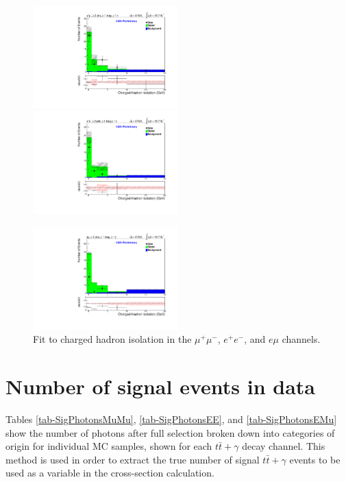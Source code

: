 \begin{figure}
\includegraphics[width=0.5\textwidth]{Plots/Fits/TTbarPhotonAnalysis/MuMu/central/Fit.pdf}
\includegraphics[width=0.5\textwidth]{Plots/Fits/TTbarPhotonAnalysis/EE/central/Fit.pdf}\\
\begin{center}
\includegraphics[width=0.5\textwidth]{Plots/Fits/TTbarPhotonAnalysis/EMu/central/Fit.pdf}
\end{center}
\caption{Fit to charged hadron isolation in the $\mu^{+}\mu^{-}$, $e^{+}e^{-}$, and $e\mu$ channels.}
\label{fig-fits}
\end{figure}

\section{Number of signal events in data} \label{sec-SigEventsInData}

Tables \ref{tab-SigPhotonsMuMu}, \ref{tab-SigPhotonsEE}, and \ref{tab-SigPhotonsEMu} show the number of photons after full selection broken down into categories of origin for individual MC samples, shown for each $t\bar{t}+\gamma$ decay channel. This method is used in order to extract the true number of signal $t\bar{t}+\gamma$ events to be used as a variable in the cross-section calculation. 

